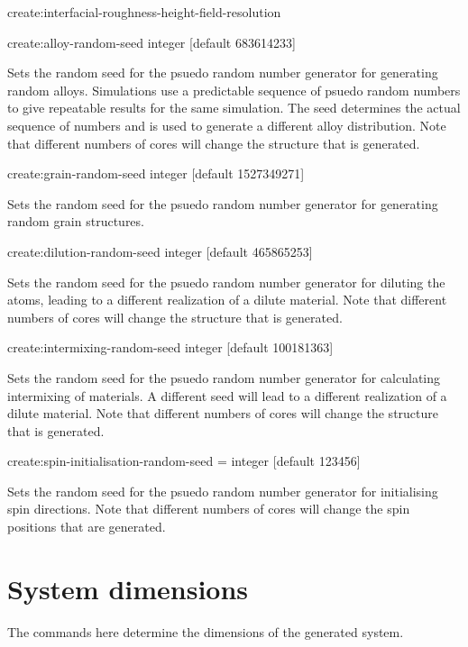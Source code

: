 {\zicf create:interfacial-roughness-height-field-resolution}

{\zicf create:alloy-random-seed integer [default 683614233]} Sets the random seed for the psuedo random number generator for generating random alloys. Simulations use a predictable sequence of psuedo random numbers to give repeatable results for the same simulation. The seed determines the actual sequence of numbers and is used to generate a different alloy distribution. Note that different numbers of cores will change the structure that is generated.

{\zicf create:grain-random-seed integer [default 1527349271]} Sets the random seed for the psuedo random number generator for generating random grain structures.

{\zicf create:dilution-random-seed integer [default 465865253]} Sets the random seed for the psuedo random number generator for diluting the atoms, leading to a different realization of a dilute material. Note that different numbers of cores will change the structure that is generated.

{\zicf create:intermixing-random-seed integer [default 100181363]} Sets the random seed for the psuedo random number generator for calculating intermixing of materials. A different seed will lead to a different realization of a dilute material. Note that different numbers of cores will change the structure that is generated.

{\zicf create:spin-initialisation-random-seed = integer [default 123456]}
Sets the random seed for the psuedo random number generator for initialising
spin directions. Note that different numbers of cores will change the
spin positions that are generated.\\

\section*{System dimensions} The commands here determine the dimensions of the generated system.

